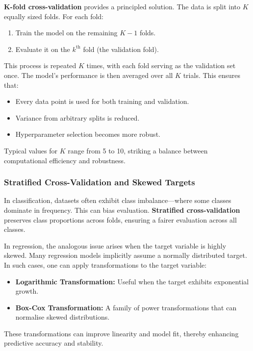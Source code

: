 \documentclass[9pt]{extarticle}
\begin{document}
\textbf{K-fold cross-validation} provides a principled solution. The data is split into $K$ equally sized folds. For each fold:
\begin{enumerate}
    \item Train the model on the remaining $K-1$ folds.
    \item Evaluate it on the $k^\text{th}$ fold (the validation fold).
\end{enumerate}
This process is repeated $K$ times, with each fold serving as the validation set once. The model’s performance is then averaged over all $K$ trials. This ensures that:
\begin{itemize}
    \item Every data point is used for both training and validation.
    \item Variance from arbitrary splits is reduced.
    \item Hyperparameter selection becomes more robust.
\end{itemize}

Typical values for $K$ range from 5 to 10, striking a balance between computational efficiency and robustness.

\subsubsection*{Stratified Cross-Validation and Skewed Targets}

In classification, datasets often exhibit class imbalance—where some classes dominate in frequency. This can bias evaluation. \textbf{Stratified cross-validation} preserves class proportions across folds, ensuring a fairer evaluation across all classes.

In regression, the analogous issue arises when the target variable is highly skewed. Many regression models implicitly assume a normally distributed target. In such cases, one can apply transformations to the target variable:
\begin{itemize}
    \item \textbf{Logarithmic Transformation:} Useful when the target exhibits exponential growth.
    \item \textbf{Box-Cox Transformation:} A family of power transformations that can normalise skewed distributions.
\end{itemize}

These transformations can improve linearity and model fit, thereby enhancing predictive accuracy and stability.
\end{document}
